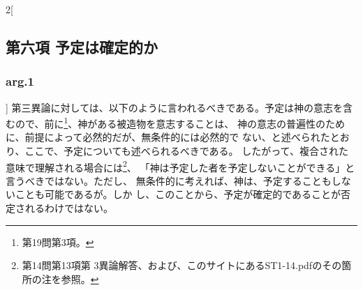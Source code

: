 \documentclass[paper=a4paper,fontsize=10pt,jafontsize=9pt,titlepage]{jlreq}
\begin{document}
\begin{paracol}{2}[\subsection{第六項 予定は確定的か}\subsubsection{arg.1}]
第三異論に対しては、以下のように言われるべきである。予定は神の意志を含
むので、前に\footnote{第19問第3項。}、神がある被造物を意志することは、
神の意志の普遍性のために、前提によって必然的だが、無条件的には必然的で
ない、と述べられたとおり、ここで、予定についても述べられるべきである。
したがって、複合された意味で理解される場合には\footnote{第14問第13項第
3異論解答、および、このサイトにあるST1-14.pdfのその箇所の注を参照。}、
「神は予定した者を予定しないことができる」と言うべきではない。ただし、
無条件的に考えれば、神は、予定することもしないことも可能であるが。しか
し、このことから、予定が確定的であることが否定されるわけではない。


\switchcolumn*



\end{paracol}
\newpage

\end{document}
